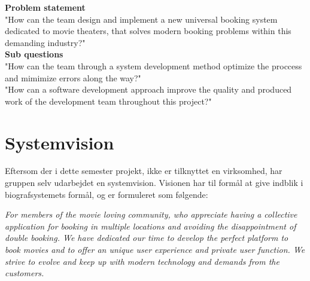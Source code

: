 \textbf{Problem statement} \\
"How can the team design and implement a new universal booking system dedicated to movie theaters, 
that solves modern booking problems within this demanding industry?" \\

\textbf{Sub questions} \\
"How can the team through a system development method optimize the proccess and mimimize errors along the way?" \\

"How can a software development approach improve the quality and produced work of the development team throughout this project?"

\section{Systemvision}
Eftersom der i dette semester projekt, ikke er tilknyttet en virksomhed, har gruppen selv udarbejdet en systemvision.
Visionen har til formål at give indblik i biografsystemets formål, og er formuleret som følgende: \\

\begin{center}
    \textit{For members of the movie loving community, who appreciate having a collective application for booking 
    in multiple locations and avoiding the disappointment of double booking. We have dedicated our 
    time to develop the perfect platform to book movies and to offer an unique user experience and private user function. 
    We strive to evolve and keep up with modern technology and demands from the customers.}
\end{center}



